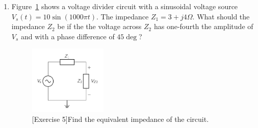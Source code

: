 \begin{enumerate}
    \item Figure~\ref{fig:ex02-05} shows a voltage divider circuit with a sinusoidal voltage source $V_s\left(t\right) = 10 \sin\left(1000\pi t\right)$. The impedance $Z_1 = 3 + j4 \Omega$. What should the impedance $Z_2$ be if the the voltage across $Z_2$ has one-fourth the amplitude of $V_s$ and with a phase difference of $45\deg$?
    \begin{figure}[h]
        \centering
        \includegraphics[width=0.35\textwidth]{figure/ch02/ex02-05.pdf}
        \caption{[Exercise 5]Find the equivalent impedance of the circuit.}
        \label{fig:ex02-05}
    \end{figure}
\end{enumerate}